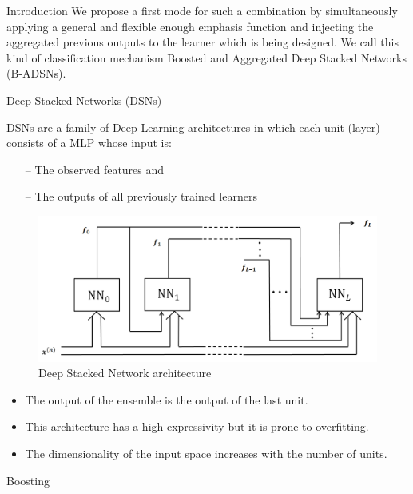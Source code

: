 \documentclass[final,hyperref={pdfpagelabels=false}]{beamer}
\begin{document}
\begin{frame}[t]
\begin{columns}[t]
\begin{column}{.465\textwidth}
\begin{block}{Introduction}
We propose a first mode for such a combination by simultaneously applying a general and flexible enough emphasis function and injecting the aggregated previous outputs to the learner which is being designed. We call this kind of classification mechanism Boosted and Aggregated Deep Stacked Networks (B-ADSNs).

\end{block}

\begin{block}{	Deep Stacked Networks (DSNs)}

DSNs are a family of Deep Learning architectures in which each unit (layer) consists of a MLP whose input is: 

\begin{itemize}
\setlength{\itemindent}{2em}

\item[--] The observed features and 
\item[--] The outputs of all previously trained learners
\end{itemize}
\centering
\begin{figure}
\includegraphics[width=0.75\linewidth]{DSNs1.png}
\caption{Deep Stacked Network architecture}
\end{figure}
\begin{itemize}
\setlength{\itemindent}{1em}
\item The output of the ensemble is the output of the last unit.
\item This architecture has a high expressivity but it is prone to overfitting.
\item The dimensionality of the input space increases with the number of units.
\end{itemize}
\end{block}

\begin{block}{	Boosting}


\end{block}
\end{column}
\end{columns}
\end{frame}
\end{document}
